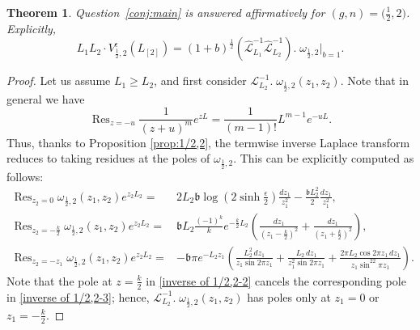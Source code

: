 \documentclass[12pt]{amsart}
\DeclareMathOperator*{\Res}{Res}
\theoremstyle{plain}
\newtheorem{theorem}{Theorem}[section]
\theoremstyle{definition}
\theoremstyle{remark}
\numberwithin{equation}{section}
\begin{document}
\begin{theorem}\label{thm:1/2,2} Question~\ref{conj:main} is answered affirmatively for $(g,n)=\big(\frac12,2\big)$. Explicitly,
 \begin{equation}
     L_1L_2\cdot V_{\frac12,2}^\epsilon(L_{[2]})= (1+b)^{\frac12}(\hat{\mathcal{L}}_{L_1}^{-1} \hat{\mathcal{L}}_{L_2}^{-1}).\; \omega_{\frac12,2}\Big|_{b=1}.
    \end{equation}
\end{theorem}
\begin{proof}
Let us assume $L_1\geq L_2$, and first consider $\mathcal{L}^{-1}_{L_2}.\;\omega_{\frac12,2}(z_1,z_2)$. Note that in general we have
\[\Res_{z=-u}\frac{1}{(z+u)^m}e^{z L} = \frac{1}{(m-1)!} L^{m-1} e^{-u L}.\]
Thus, thanks to Proposition \ref{prop:1/2,2}, the termwise inverse Laplace transform reduces to taking residues at the poles of $\omega_{\frac12,2}$. This can be explicitly computed as follows:
    \begin{align}
        \Res_{z_2=0}\omega_{\frac12,2}(z_1,z_2)e^{z_2L_2}=&2L_2\mathfrak{b}\log\left(2\sinh\frac{\epsilon}{2}\right)\frac{dz_1}{z_1^2}-\frac{\mathfrak{b}L_2^2}{2}\frac{dz_1}{z_1^2},\label{inverse of 1/2,2-1}\\
        \Res_{z_2=-\frac{k}{2}}\omega_{\frac12,2}(z_1,z_2)e^{z_2L_2}=&\mathfrak{b}L_2\frac{(-1)^k}{k}e^{-\frac{k}{2}L_2}\left(\frac{dz_1}{(z_1-\frac{k}{2})^2}+\frac{dz_1}{(z_1+\frac{k}{2})^2}\right),\label{inverse of 1/2,2-2}\\
        \Res_{z_2=-z_1}\omega_{\frac12,2}(z_1,z_2)e^{z_2L_2}=&-\mathfrak{b}\pi e^{-L_2 z_1}\left(\frac{L_2^2\,dz_1}{z_1\sin2\pi z_1}+\frac{L_2\,dz_1}{z_1^2\sin2\pi z_1}+\frac{2\pi L_2\cos2\pi z_1\,dz_1}{z_1\sin^22\pi z_1}\right).\label{inverse of 1/2,2-3}
    \end{align}
Note that the pole at $z=\frac{k}{2}$ in \eqref{inverse of 1/2,2-2} cancels the corresponding pole in \eqref{inverse of 1/2,2-3}; hence, $\mathcal{L}^{-1}_{L_2}.\;\omega_{\frac12,2}(z_1,z_2)$ has poles only at $z_1=0$ or $z_1=-\frac{k}{2}$.


\end{proof}
\end{document}
